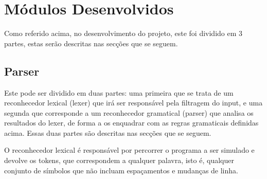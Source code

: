 \documentclass{report}
\begin{document}
\noindent
\par
\begin{Parallel}[v]{0.48\textwidth}{0.48\textwidth}
\ParallelPar
\end{Parallel}

\section{Módulos Desenvolvidos}

Como referido acima, no desenvolvimento do projeto, este foi dividido em 3 partes, estas serão descritas nas secções que se seguem.

\subsection{Parser}

\quad Este pode ser dividido em duas partes:
  uma primeira que se trata de um reconhecedor lexical (lexer) que irá ser responsável pela filtragem do input,
	 e uma segunda que corresponde a um reconhecedor gramatical (parser) que analisa os resultados do lexer,
	 de forma a os enquadrar com as regras gramaticais definidas acima. Essas duas partes são descritas
	  nas secções que se seguem.

\quad O reconhecedor lexical é responsável por percorrer o programa a ser simulado e devolve os tokens, que correspondem a qualquer palavra,
 isto é, qualquer conjunto de símbolos que não incluam espaçamentos e mudanças de linha.
\end{document}
